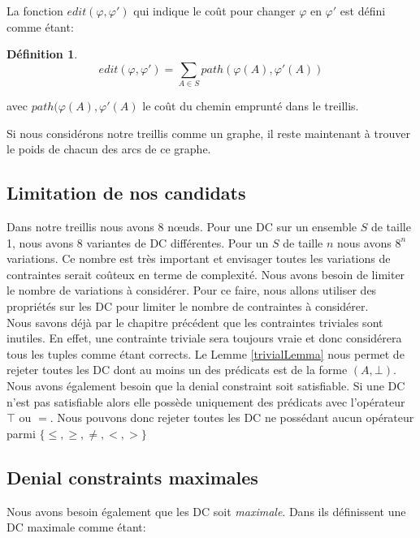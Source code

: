 \documentclass[letterpaper, 12pt]{report}
\theoremstyle{definition}
\newtheorem{mydef}{Définition}
\begin{document}
La fonction $edit(\varphi , \varphi ')$ qui indique le coût pour changer $\varphi$ en $\varphi'$ est défini comme étant:

\begin{mydef}
$$
 edit(\varphi, \varphi') = \sum_{A \in S} path(\varphi(A),\varphi'(A))$$
 
avec $path(\varphi(A),\varphi'(A)$ le coût du chemin emprunté dans le treillis.
\end{mydef}

Si nous considérons notre treillis comme un graphe, il reste maintenant à trouver le poids de chacun des arcs de ce graphe.



\subsection{Limitation de nos candidats}


Dans notre treillis nous avons 8 nœuds. Pour une DC sur un ensemble $S$ de taille 1, nous avons 8 variantes de DC différentes. Pour un $S$ de taille $n$ nous avons $8^n$ variations. Ce nombre est très important et envisager toutes les variations de contraintes serait coûteux en terme de complexité. Nous avons besoin de limiter le nombre de variations à considérer. Pour ce faire, nous allons utiliser des propriétés sur les DC pour limiter le nombre de contraintes à considérer.\\

Nous savons déjà par le chapitre précédent que les contraintes triviales sont inutiles. En effet, une contrainte triviale sera toujours vraie et donc considérera tous les tuples comme étant corrects. Le Lemme \ref{trivialLemma} nous permet de rejeter toutes les DC dont au moins un des prédicats est de la forme $(A,\bot)$.\\

Nous avons également besoin que la denial constraint soit satisfiable. Si une DC n'est pas satisfiable alors elle possède uniquement des prédicats avec l'opérateur $\top$ ou $=$. Nous pouvons donc rejeter toutes les DC ne possédant aucun opérateur parmi $\{ \leq,\geq,\neq,<,> \}$\\

\subsection{Denial constraints maximales}

Nous avons besoin également que les DC soit \emph{maximale}. Dans \cite{main} ils définissent une DC maximale comme étant:
\end{document}
